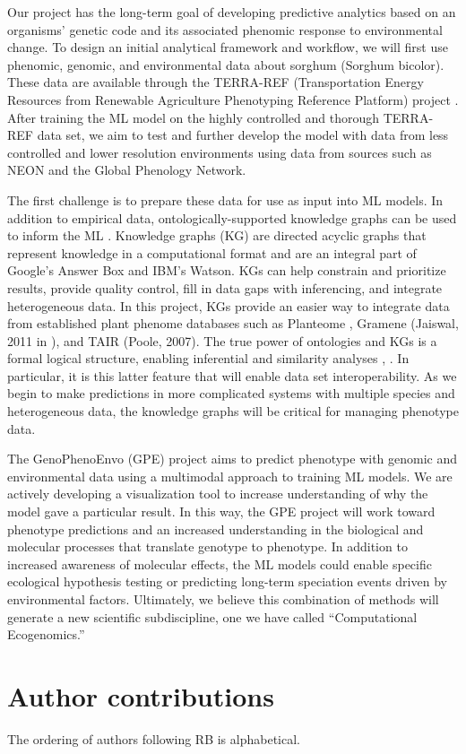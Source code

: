 \documentclass[11pt,]{article}
\begin{document}
Our project has the long-term goal of developing predictive analytics
based on an organisms' genetic code and its associated phenomic response
to environmental change. To design an initial analytical framework and
workflow, we will first use phenomic, genomic, and environmental data
about sorghum (Sorghum bicolor). These data are available through the
TERRA-REF (Transportation Energy Resources from Renewable Agriculture
Phenotyping Reference Platform) project \citet{lebauer2020data}
\citet{burnette2018terra}. After training the ML model on the highly
controlled and thorough TERRA-REF data set, we aim to test and further
develop the model with data from less controlled and lower resolution
environments using data from sources such as NEON and the Global
Phenology Network.

The first challenge is to prepare these data for use as input into ML
models. In addition to empirical data, ontologically-supported knowledge
graphs can be used to inform the ML \citet{mungall2017monarch}.
Knowledge graphs (KG) are directed acyclic graphs that represent
knowledge in a computational format and are an integral part of Google's
Answer Box and IBM's Watson. KGs can help constrain and prioritize
results, provide quality control, fill in data gaps with inferencing,
and integrate heterogeneous data. In this project, KGs provide an easier
way to integrate data from established plant phenome databases such as
Planteome \citet{cooper2018planteome}, Gramene (Jaiswal, 2011 in
\citet{pereira2011plant}), and TAIR (Poole, 2007). The true power of
ontologies and KGs is a formal logical structure, enabling inferential
and similarity analyses \citet{mungall2017monarch},
\citet{washington2009linking}. In particular, it is this latter feature
that will enable data set interoperability. As we begin to make
predictions in more complicated systems with multiple species and
heterogeneous data, the knowledge graphs will be critical for managing
phenotype data.

The GenoPhenoEnvo (GPE) project aims to predict phenotype with genomic
and environmental data using a multimodal approach to training ML
models. We are actively developing a visualization tool to increase
understanding of why the model gave a particular result. In this way,
the GPE project will work toward phenotype predictions and an increased
understanding in the biological and molecular processes that translate
genotype to phenotype. In addition to increased awareness of molecular
effects, the ML models could enable specific ecological hypothesis
testing or predicting long-term speciation events driven by
environmental factors. Ultimately, we believe this combination of
methods will generate a new scientific subdiscipline, one we have called
``Computational Ecogenomics.''

\hypertarget{author-contributions}{%
\section{Author contributions}\label{author-contributions}}

The ordering of authors following RB is alphabetical.

\renewcommand\refname{References}

\end{document}
